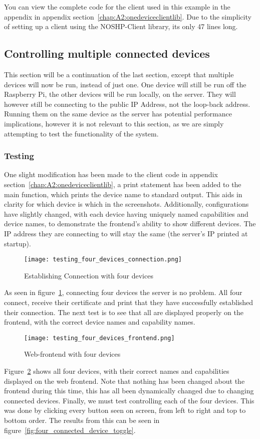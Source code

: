 You can view the complete code for the client used in this example in the appendix in appendix section~\ref{chap:A2:onedeviceclientlib}. Due to the simplicity of setting up a client using the NOSHP-Client library, its only 47 lines long.

\subsection{Controlling multiple connected devices}
This section will be a continuation of the last section, except that multiple devices will now be run, instead of just one. One device will still be run off the Raspberry Pi, the other devices will be run locally, on the server. They will however still be connecting to the public IP Address, not the loop-back address. Running them on the same device as the server has potential performance implications, however it is not relevant to this section, as we are simply attempting to test the functionality of the system.

\subsubsection{Testing}
One slight modification has been made to the client code in appendix section~\ref{chap:A2:onedeviceclientlib}, a print statement has been added to the main function, which prints the device name to standard output. This aids in clarity for which device is which in the screenshots. Additionally, configurations have slightly changed, with each device having uniquely named capabilities and device names, to demonstrate the frontend's ability to show different devices. The IP address they are connecting to will stay the same (the server's IP printed at startup).

\begin{figure}[h]
\caption{Establishing Connection with four devices}
\texttt{[image: testing\_four\_devices\_connection.png]}
\label{fig:four_connected_device_connection}
\end{figure}
As seen in figure~\ref{fig:four_connected_device_connection}, connecting four devices the server is no problem. All four connect, receive their certificate and print that they have successfully established their connection. The next test is to see that all are displayed properly on the frontend, with the correct device names and capability names.


\begin{figure}[h]
\caption{Web-frontend with four devices}
\texttt{[image: testing\_four\_devices\_frontend.png]}
\label{fig:four_connected_device_frontend}
\end{figure}
Figure~\ref{fig:four_connected_device_frontend} shows all four devices, with their correct names and capabilities displayed on the web frontend. Note that nothing has been changed about the frontend during this time, this has all been dynamically changed due to changing connected devices. Finally, we must test controlling each of the four devices. This was done by clicking every button seen on screen, from left to right and top to bottom order. The results from this can be seen in figure~\ref{fig:four_connected_device_toggle}.

